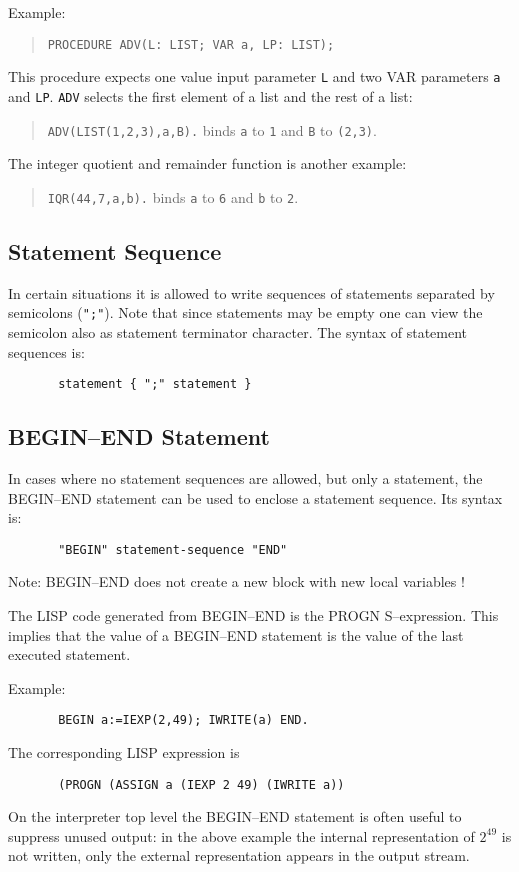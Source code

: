 Example: 
\begin{quote}
\verb/PROCEDURE ADV(L: LIST; VAR a, LP: LIST);/
\end{quote}
This procedure expects one value input parameter \verb/L/ 
and two VAR parameters \verb/a/ and \verb/LP/.
\verb/ADV/ selects the first element of a list and the rest of
a list:
\begin{quote}
       \verb/ADV(LIST(1,2,3),a,B)./ binds 
       \verb/a/ to \verb/1/ and \verb/B/ to \verb/(2,3)/.
\end{quote}
The integer quotient and remainder function is
another example:
\begin{quote}
       \verb/IQR(44,7,a,b)./ binds 
       \verb/a/ to \verb/6/ and \verb/b/ to \verb/2/.
\end{quote}


\subsection{Statement Sequence}

In certain situations it is allowed to write sequences
of statements separated by semicolons (\verb/";"/).
Note that since statements may be empty one can view
the semicolon also as statement terminator character. 
The syntax of statement sequences is:
\begin{verbatim}
       statement { ";" statement } 
\end{verbatim}


\subsection{BEGIN--END Statement}
   
In cases where no statement sequences are allowed, but 
only a statement, the BEGIN--END statement can be used to 
enclose a statement sequence.
Its syntax is:
\begin{verbatim}
       "BEGIN" statement-sequence "END" 
\end{verbatim}

Note: BEGIN--END does not create a new block with new 
local variables !

{\small
The LISP code generated from BEGIN--END is the
PROGN S--expression. 
This implies that the value of a BEGIN--END statement
is the value of the last executed statement.
}

Example:
\begin{verbatim}
       BEGIN a:=IEXP(2,49); IWRITE(a) END.
\end{verbatim}
{\small
The corresponding LISP expression is
\begin{verbatim}
       (PROGN (ASSIGN a (IEXP 2 49) (IWRITE a))
\end{verbatim}
}
On the interpreter top level the BEGIN--END statement is 
often useful to suppress unused output: in the above example 
the internal representation of $2^{49}$ is not 
written, only the external representation appears in
the output stream.


